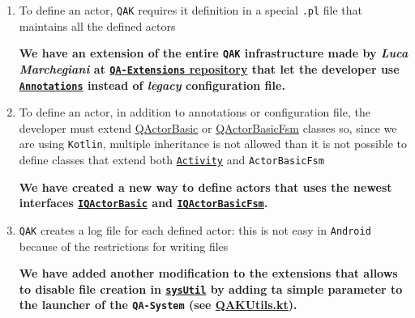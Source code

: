 \begin{enumerate}
	\item To define an actor, \texttt{QAK} requires it definition in a special \texttt{.pl} file that maintains all the defined actors
	\begin{tcolorbox}
		\begin{center}
			\textbf{We have an extension of the entire \texttt{QAK} infrastructure made by \textit{Luca Marchegiani} at \href{https://github.com/LM-96/QA-Extensions}{\texttt{QA-Extensions} repository} that let the developer use \href{https://kotlinlang.org/docs/annotations.html}{\texttt{Annotations}} instead of \textit{legacy} configuration file.}
		\end{center}
	\end{tcolorbox}

	\item  To define an actor, in addition to annotations or configuration file, the developer must extend \href{https://github.com/LM-96/QA-Extensions/blob/main/it.unibo.qakactor/src/main/kotlin/QActorBasic.kt}{QActorBasic} or \href{https://github.com/LM-96/QA-Extensions/blob/main/it.unibo.qakactor/src/main/kotlin/QActorBasicFsm.kt}{QActorBasicFsm} classes so, since we are using \texttt{Kotlin}, multiple inheritance is not allowed than it is not possible to define classes that extend both \href{https://developer.android.com/reference/android/app/Activity}{\texttt{Activity}} and \texttt{ActorBasicFsm}
	\begin{tcolorbox}
		\begin{center}
			\textbf{We have created a new way to define actors that uses the newest interfaces \href{https://github.com/LM-96/QA-Extensions/blob/android/it.unibo.qakactor/src/main/kotlin/IQActorBasic.kt}{\texttt{IQActorBasic}} and \href{https://github.com/LM-96/QA-Extensions/blob/android/it.unibo.qakactor/src/main/kotlin/IQActorBasicFsm.kt}{\texttt{IQActorBasicFsm}}.}
		\end{center}
	\end{tcolorbox}

	\item \texttt{QAK} creates a log file for each defined actor: this is not easy in \texttt{Android} because of the restrictions for writing files
	\begin{tcolorbox}
		\begin{center}
			\textbf{We have added another modification to the extensions that allows to disable file creation in \href{https://github.com/LM-96/QA-Extensions/blob/android/it.unibo.qakactor/src/main/kotlin/sysUtil.kt}{\texttt{sysUtil}} by adding ta simple parameter to the launcher of the \texttt{QA-System} (see \href{https://github.com/LucaLand/MobileSystemsProject-LL/blob/0.9.1/app/src/main/java/it/unibo/mobilesystems/actors/QAKUtils.kt}{QAKUtils.kt}).}
		\end{center}
	\end{tcolorbox}
	
\end{enumerate}

